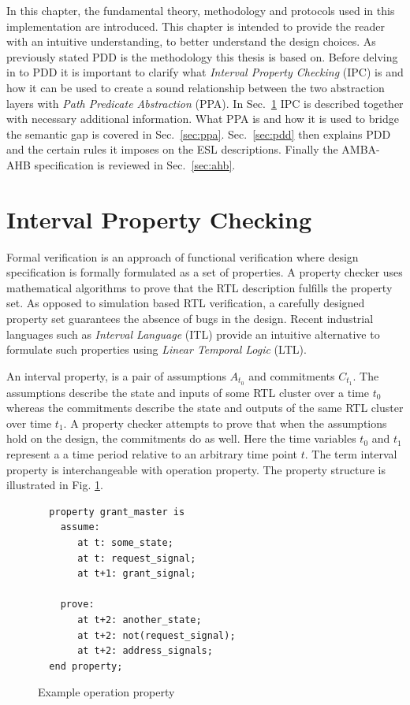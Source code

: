 \label{ch:theory}

In this chapter, the fundamental theory, methodology and protocols used in this implementation are introduced. This chapter is intended to provide the reader with an intuitive understanding, to better understand the design choices. As previously stated PDD is the methodology this thesis is based on. Before delving in to PDD it is important to clarify what \textit{Interval Property Checking} (IPC) is and how it can be used to create a sound relationship between the two abstraction layers with \textit{Path Predicate Abstraction} (PPA). In Sec.~\ref{sec:ipc} IPC is described together with necessary additional information. What PPA is and how it is used to bridge the semantic gap is covered in Sec.~\ref{sec:ppa}. Sec.~\ref{sec:pdd} then explains PDD and the certain rules it imposes on the ESL descriptions. Finally the AMBA-AHB specification is reviewed in Sec.~\ref{sec:ahb}.       


\section{Interval Property Checking}
\label{sec:ipc}
Formal verification is an approach of functional verification where design specification is formally formulated as a set of properties. A property checker uses mathematical algorithms to prove that the RTL description fulfills the property set. As opposed to simulation based RTL verification, a carefully designed property set guarantees the absence of bugs in the design. Recent industrial languages such as \textit{Interval Language} (ITL) provide an intuitive alternative to formulate such properties using \textit{Linear Temporal Logic} (LTL). \par
An interval property, is a pair of assumptions $A_{t_0}$ and commitments $C_{t_1}$. The assumptions describe the state and inputs of some RTL cluster over a time $t_0$ whereas the commitments describe the state and outputs of the same RTL cluster over time $t_1$. A property checker attempts to prove that when the assumptions hold on the design, the commitments do as well. Here the time variables $t_0$ and $t_1$ represent a a time period relative to an arbitrary time point $t$. The term interval property is interchangeable with operation property. The property structure is illustrated in Fig.
\ref{fig:exop}.  

\begin{figure}[hbt]
\begin{lstlisting}
  property grant_master is
    assume:
       at t: some_state;
       at t: request_signal;
       at t+1: grant_signal;

    prove:
       at t+2: another_state;
       at t+2: not(request_signal);
       at t+2: address_signals;
  end property; 
\end{lstlisting}
\label{fig:exop}
\caption{Example operation property}
\end{figure}

